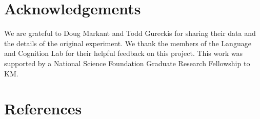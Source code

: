 \documentclass[10pt, letterpaper]{article}
\begin{document}
\section{Acknowledgements}\label{acknowledgements}

We are grateful to Doug Markant and Todd Gureckis for sharing their data
and the details of the original experiment. We thank the members of the
Language and Cognition Lab for their helpful feedback on this project.
This work was supported by a National Science Foundation Graduate
Research Fellowship to KM.

\section{References}\label{references}

\setlength{\parindent}{-0.1in} \setlength{\leftskip}{0.125in} \noindent
\end{document}
